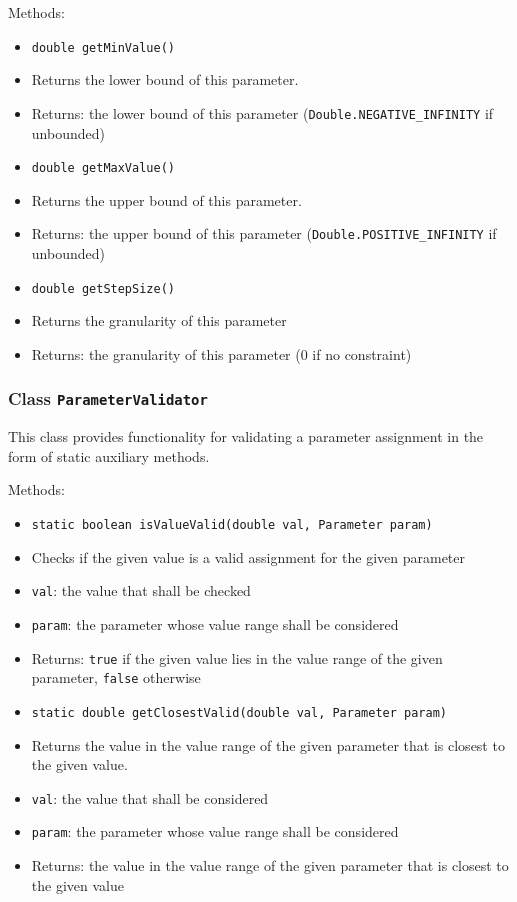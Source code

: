 \documentclass[parskip=full,11pt]{scrartcl}
\begin{document}
Methods:

\begin{itemize}\itemsep -10pt
	\item \texttt{double getMinValue()}
	\item[] Returns the lower bound of this parameter.
	\item[] Returns: the lower bound of this parameter (\texttt{Double.NEGATIVE\_INFINITY} if unbounded)
	\item \texttt{double getMaxValue()}
	\item[] Returns the upper bound of this parameter.
	\item[] Returns: the upper bound of this parameter (\texttt{Double.POSITIVE\_INFINITY} if unbounded)
	\item \texttt{double getStepSize()}
	\item[] Returns the granularity of this parameter
	\item[]Returns: the granularity of this parameter (\(0\) if no constraint)
\end{itemize}

\subsubsection{Class \texttt{ParameterValidator}}

This class provides functionality for validating a parameter assignment in the form of static auxiliary methods.

Methods:

\begin{itemize} \itemsep -10pt
	\item \texttt{static boolean isValueValid(double val, Parameter param)}
	\item[] Checks if the given value is a valid assignment for the given parameter
	\item[] \texttt{val}: the value that shall be checked
	\item[] \texttt{param}: the parameter whose value range shall be considered
	\item[] Returns: \texttt{true} if the given value lies in the value range of the given parameter, \texttt{false} otherwise
	\item \texttt{static double getClosestValid(double val, Parameter param)}
	\item[] Returns the value in the value range of the given parameter that is closest to the given value.
	\item[] \texttt{val}: the value that shall be considered
	\item[] \texttt{param}: the parameter whose value range shall be considered
	\item[] Returns: the value in the value range of the given parameter that is closest to the given value
\end{itemize}
\end{document}

